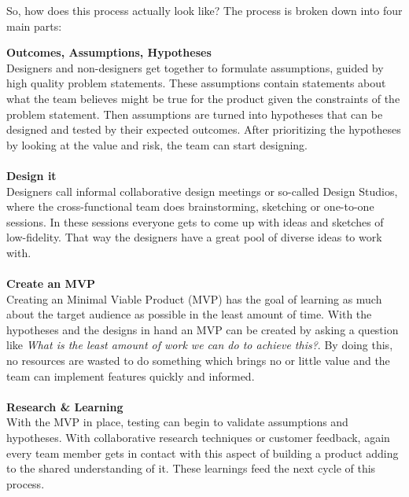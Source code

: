 So, how does this process actually look like? The process is broken down into four main parts:


\textbf{Outcomes, Assumptions, Hypotheses} \\ %
Designers and non-designers get together to formulate assumptions, guided by high quality problem
statements. These assumptions contain statements about what the team believes might be true for the
product given the constraints of the problem statement. Then assumptions are turned into hypotheses
that can be designed and tested by their expected outcomes. After prioritizing the hypotheses by
looking at the value and risk, the team can start designing.
\\\\
\textbf{Design it} \\
Designers call informal collaborative design meetings or so-called Design Studios, where the
cross-functional team does brainstorming, sketching or one-to-one sessions. In these sessions
everyone gets to come up with ideas and sketches of low-fidelity. That way the designers have a
great pool of diverse ideas to work with.  \\\\ 
\textbf{Create an MVP} \\
Creating an Minimal Viable Product (MVP) has the goal of learning as much about the target audience
as possible in the least amount of time. With the hypotheses and the designs in hand an MVP can be
created by asking a question like \textit{What is the least amount of work we can do to achieve
this?}. By doing this, no resources are wasted to do something which brings no or little value and
the team can implement features quickly and informed.
 \\\\
\textbf{Research \& Learning} \\
With the MVP in place, testing can begin to validate assumptions and hypotheses. With collaborative
research techniques or customer feedback, again every team member gets in contact with this aspect
of building a product adding to the shared understanding of it. These learnings feed the next cycle
of this process.  \\

